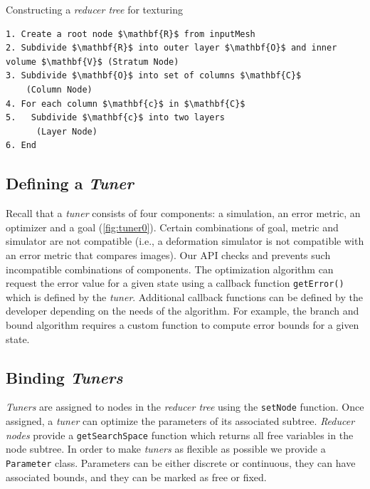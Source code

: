 \begin{algorithm}
\caption{Constructing a \emph{reducer tree} for texturing}
\label{alg:ReducerTree}
\begin{lstlisting}[mathescape=true]
1. Create a root node $\mathbf{R}$ from inputMesh 
2. Subdivide $\mathbf{R}$ into outer layer $\mathbf{O}$ and inner volume $\mathbf{V}$ (Stratum Node) 
3. Subdivide $\mathbf{O}$ into set of columns $\mathbf{C}$ 
    (Column Node) 
4. For each column $\mathbf{c}$ in $\mathbf{C}$ 
5.   Subdivide $\mathbf{c}$ into two layers 
      (Layer Node) 
6. End 
\end{lstlisting}
\end{algorithm}

\subsection{Defining a \emph{Tuner}}
Recall that a \emph{tuner} consists of four components: a simulation, an error metric, an optimizer and a goal (\autoref{fig:tuner0}). Certain combinations of goal, metric and simulator are not compatible (i.e., a deformation simulator is not compatible with an error metric that compares images). Our API checks and prevents such incompatible combinations of components.  The optimization algorithm can request the error value for a given state using a callback function \verb|getError()| which is defined by the \emph{tuner}. Additional callback functions can be defined by the developer depending on the needs of the algorithm. For example, the branch and bound algorithm requires a custom  function to compute error bounds for a given state.


\subsection{Binding \emph{Tuners}}

\emph{Tuners} are assigned to nodes in the \emph{reducer tree} using the \verb|setNode| function. Once assigned, a \emph{tuner} can optimize the parameters of its associated subtree. \emph{Reducer nodes} provide a \verb|getSearchSpace| function which returns all free variables in the node subtree. In order to make \emph{tuners} as flexible as possible we provide a \verb|Parameter| class. Parameters can be either discrete or continuous, they can have associated bounds, and they can be marked as free or fixed.

